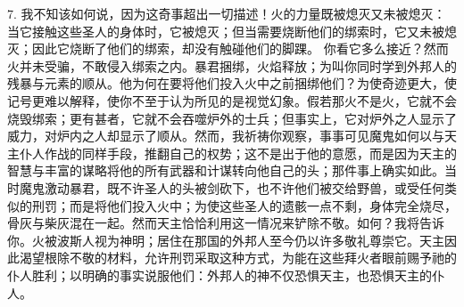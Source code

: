7. 我不知该如何说，因为这奇事超出一切描述！火的力量既被熄灭又未被熄灭：当它接触这些圣人的身体时，它被熄灭；但当需要烧断他们的绑索时，它又未被熄灭；因此它烧断了他们的绑索，却没有触碰他们的脚踝。 你看它多么接近？然而火并未受骗，不敢侵入绑索之内。暴君捆绑，火焰释放；为叫你同时学到外邦人的残暴与元素的顺从。他为何在要将他们投入火中之前捆绑他们？为使奇迹更大，使记号更难以解释，使你不至于认为所见的是视觉幻象。假若那火不是火，它就不会烧毁绑索；更有甚者，它就不会吞噬炉外的士兵；但事实上，它对炉外之人显示了威力，对炉内之人却显示了顺从。然而，我祈祷你观察，事事可见魔鬼如何以与天主仆人作战的同样手段，推翻自己的权势；这不是出于他的意愿，而是因为天主的智慧与丰富的谋略将他的所有武器和计谋转向他自己的头；那件事上确实如此。当时魔鬼激动暴君，既不许圣人的头被剑砍下，也不许他们被交给野兽，或受任何类似的刑罚；而是将他们投入火中；为使这些圣人的遗骸一点不剩，身体完全烧尽，骨灰与柴灰混在一起。然而天主恰恰利用这一情况来铲除不敬。如何？我将告诉你。火被波斯人视为神明；居住在那国的外邦人至今仍以许多敬礼尊崇它。天主因此渴望根除不敬的材料，允许刑罚采取这种方式，为能在这些拜火者眼前赐予祂的仆人胜利；以明确的事实说服他们：外邦人的神不仅恐惧天主，也恐惧天主的仆人。\par


